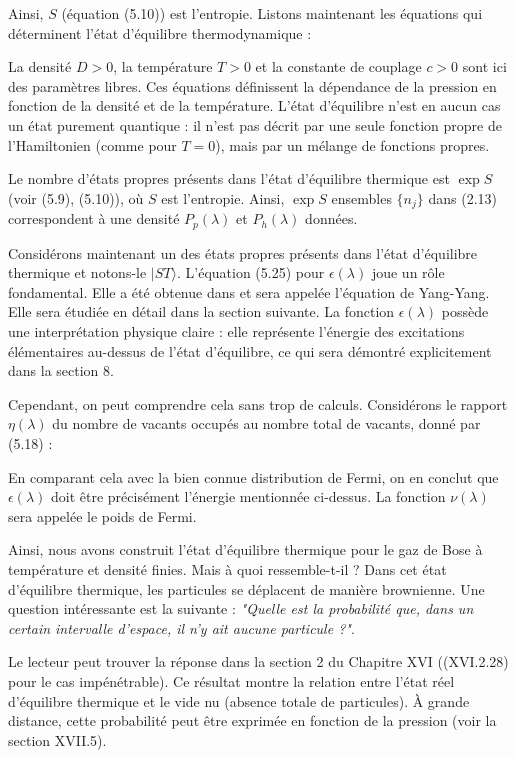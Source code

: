 Ainsi, \( S \) (équation (5.10)) est l'entropie. Listons maintenant les équations qui déterminent l'état d'équilibre thermodynamique :


La densité \( D > 0 \), la température \( T > 0 \) et la constante de couplage \( c > 0 \) sont ici des paramètres libres. Ces équations définissent la dépendance de la pression en fonction de la densité et de la température. L'état d'équilibre n'est en aucun cas un état purement quantique : il n'est pas décrit par une seule fonction propre de l'Hamiltonien (comme pour \( T = 0 \)), mais par un mélange de fonctions propres. 

Le nombre d'états propres présents dans l'état d'équilibre thermique est \( \exp S \) (voir (5.9), (5.10)), où \( S \) est l'entropie. Ainsi, \( \exp S \) ensembles \( \{n_j\} \) dans (2.13) correspondent à une densité \( P_p(\lambda) \) et \( P_h(\lambda) \) données.

Considérons maintenant un des états propres présents dans l'état d'équilibre thermique et notons-le \( |ST\rangle \). L'équation (5.25) pour \( \epsilon(\lambda) \) joue un rôle fondamental. Elle a été obtenue dans \cite{YangYang1969} et sera appelée l'équation de Yang-Yang. Elle sera étudiée en détail dans la section suivante. La fonction \( \epsilon(\lambda) \) possède une interprétation physique claire : elle représente l'énergie des excitations élémentaires au-dessus de l'état d'équilibre, ce qui sera démontré explicitement dans la section 8.

Cependant, on peut comprendre cela sans trop de calculs. Considérons le rapport \( \eta(\lambda) \) du nombre de vacants occupés au nombre total de vacants, donné par (5.18) :

En comparant cela avec la bien connue distribution de Fermi, on en conclut que \( \epsilon(\lambda) \) doit être précisément l'énergie mentionnée ci-dessus. La fonction \( \nu(\lambda) \) sera appelée le poids de Fermi.

Ainsi, nous avons construit l'état d'équilibre thermique pour le gaz de Bose à température et densité finies. Mais à quoi ressemble-t-il ? Dans cet état d'équilibre thermique, les particules se déplacent de manière brownienne. Une question intéressante est la suivante :  
\textit{"Quelle est la probabilité que, dans un certain intervalle d'espace, il n'y ait aucune particule ?"}.  

Le lecteur peut trouver la réponse dans la section 2 du Chapitre XVI ((XVI.2.28) pour le cas impénétrable). Ce résultat montre la relation entre l'état réel d'équilibre thermique et le vide nu (absence totale de particules). À grande distance, cette probabilité peut être exprimée en fonction de la pression (voir la section XVII.5).

